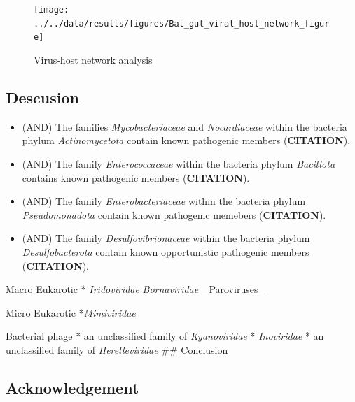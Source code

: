 \documentclass[
]{article}
\providecommand{\tightlist}{%
  \setlength{\itemsep}{0pt}\setlength{\parskip}{0pt}}
\begin{document}
\begin{figure}
\texttt{[image: ../../data/results/figures/Bat\_gut\_viral\_host\_network\_figure]} \caption{Virus-host network analysis}\label{fig:FigA}
\end{figure}

\subsection{Descusion}\label{descusion}

\begin{itemize}
\tightlist
\item
  (AND) The families \emph{Mycobacteriaceae} and \emph{Nocardiaceae}
  within the bacteria phylum \emph{Actinomycetota} contain known
  pathogenic members (\textbf{CITATION}).
\item
  (AND) The family \emph{Enterococcaceae} within the bacteria phylum
  \emph{Bacillota} contains known pathogenic members
  (\textbf{CITATION}).
\item
  (AND) The family \emph{Enterobacteriaceae} within the bacteria phylum
  \emph{Pseudomonadota} contain known pathogenic memebers
  (\textbf{CITATION}).
\item
  (AND) The family \emph{Desulfovibrionaceae} within the bacteria phylum
  \emph{Desulfobacterota} contain known opportunistic pathogenic members
  (\textbf{CITATION}).
\end{itemize}

Macro Eukarotic * \emph{Iridoviridae} \emph{\emph{Bornaviridae}
}\_Paroviruses\_

Micro Eukarotic *\emph{Mimiviridae}

Bacterial phage * an unclassified family of \emph{Kyanoviridae} *
\emph{Inoviridae} * an unclassified family of \emph{Herelleviridae} \#\#
Conclusion

\subsection{Acknowledgement}\label{acknowledgement}
\end{document}
